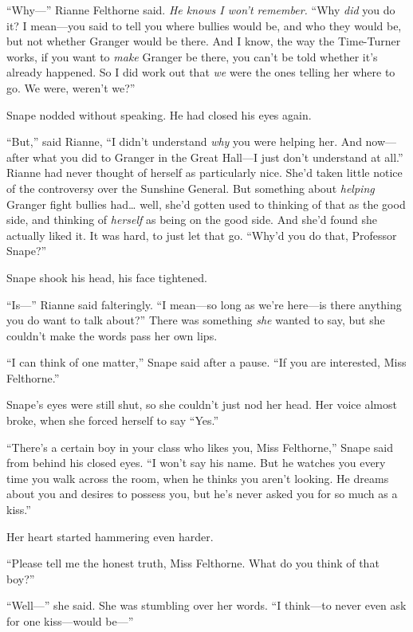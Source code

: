 ``Why---'' Rianne Felthorne said. \emph{He knows I won't remember.}
``Why \emph{did} you do it? I mean---you said to tell you where bullies
would be, and who they would be, but not whether Granger would be there.
And I know, the way the Time-Turner works, if you want to \emph{make}
Granger be there, you can't be told whether it's already happened. So I
did work out that \emph{we} were the ones telling her where to go. We
were, weren't we?''

Snape nodded without speaking. He had closed his eyes again.

``But,'' said Rianne, ``I didn't understand \emph{why} you were helping
her. And now---after what you did to Granger in the Great Hall---I just
don't understand at all.'' Rianne had never thought of herself as
particularly nice. She'd taken little notice of the controversy over the
Sunshine General. But something about \emph{helping} Granger fight
bullies had\ldots{} well, she'd gotten used to thinking of that as the
good side, and thinking of \emph{herself} as being on the good side. And
she'd found she actually liked it. It was hard, to just let that go.
``Why'd you do that, Professor Snape?''

Snape shook his head, his face tightened.

``Is---'' Rianne said falteringly. ``I mean---so long as we're here---is
there anything you do want to talk about?'' There was something
\emph{she} wanted to say, but she couldn't make the words pass her own
lips.

``I can think of one matter,'' Snape said after a pause. ``If you are
interested, Miss Felthorne.''

Snape's eyes were still shut, so she couldn't just nod her head. Her
voice almost broke, when she forced herself to say ``Yes.''

``There's a certain boy in your class who likes you, Miss Felthorne,''
Snape said from behind his closed eyes. ``I won't say his name. But he
watches you every time you walk across the room, when he thinks you
aren't looking. He dreams about you and desires to possess you, but he's
never asked you for so much as a kiss.''

Her heart started hammering even harder.

``Please tell me the honest truth, Miss Felthorne. What do you think of
that boy?''

``Well---'' she said. She was stumbling over her words. ``I think---to
never even ask for one kiss---would be---''

